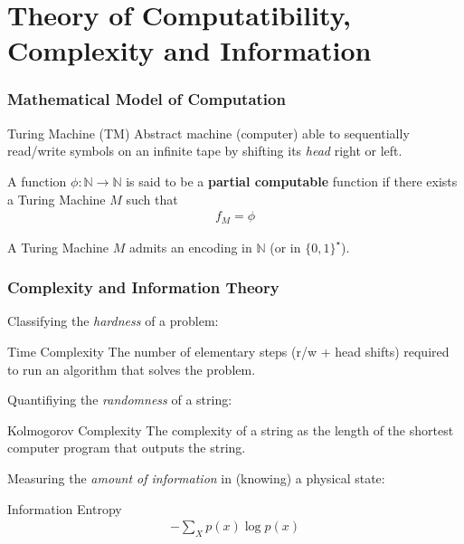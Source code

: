 \section[Theory. of Computability \& Complexity]{Theory of Computatibility, Complexity and Information}
\begin{frame}
\frametitle{Mathematical Model of Computation}


\begin{block}
{Turing Machine (TM)}
Abstract machine (computer) able to sequentially read/write symbols on an infinite tape by shifting its \emph{head} right or left.
\end{block}
\begin{figure}
\center

\end{figure}

\pause
A function $\phi :\mathbb{N} \rightarrow \mathbb{N} $ is said to be a {\bf partial computable} function if there exists a Turing Machine $M$ such that
\begin{align*}
f_M =\phi 
\end{align*}

\pause
A Turing Machine $M$ admits an encoding in  $\mathbb{N}$ (or in $\{0,1\}^\star$).


\end{frame}


\begin{frame}
\frametitle{Complexity and Information Theory}
{\scriptsize Classifying the \emph{hardness} of a problem:}
\begin{block}
{Time Complexity}
The number of elementary steps (r/w + head shifts) required to run an algorithm that solves the problem.
\end{block}

\pause
{\scriptsize Quantifiying the \emph{randomness} of a string:}
\begin{block}
{Kolmogorov Complexity}
The complexity of a string as the length of the shortest computer program that outputs the string.
\end{block}
\pause
{\scriptsize Measuring the \emph{amount of information} in (knowing) a physical state:} 
\begin{block}
{Information Entropy}
\begin{align*}
-\sum_X  p(x)\log{p(x)}
\end{align*}
\end{block}

\note{}
\end{frame}


